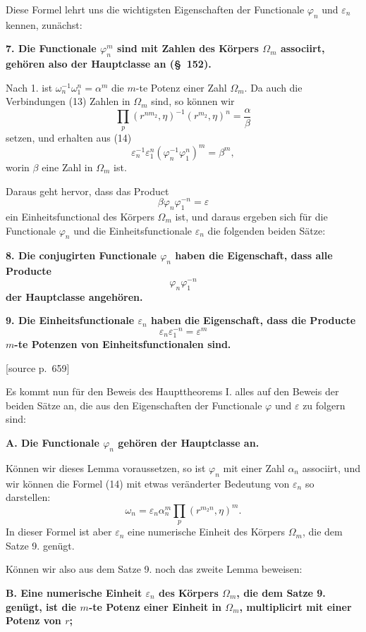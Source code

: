 \documentclass[11pt]{article}
\newcommand{\eps}{\varepsilon}
\newcommand{\srcpage}[1]{\par\medskip\noindent\textsf{[source p.~#1]}\par\smallskip}
\begin{document}
Diese Formel lehrt uns die wichtigsten Eigenschaften der Functionale $\varphi_n$ und $\eps_n$ kennen, zunächst:

\textbf{7. Die Functionale $\varphi_n^m$ sind mit Zahlen des Körpers $\Omega_m$ associirt, gehören also der Hauptclasse an (\S~152).}

Nach 1. ist $\omega_n^{-1}\omega_1^n=\alpha^m$ die $m$-te Potenz einer Zahl $\Omega_m$. Da auch die Verbindungen (13) Zahlen in $\Omega_m$ sind, so können wir
\[
  \prod_p(r^{nm_2},\eta)^{-1}(r^{m_2},\eta)^n=\frac{\alpha}{\beta}
\]
setzen, und erhalten aus (14)
\[
  \eps_n^{-1}\eps_1^n(\varphi_n^{-1}\varphi_1^n)^m=\beta^m,
\]
worin $\beta$ eine Zahl in $\Omega_m$ ist.

Daraus geht hervor, dass das Product
\[
  \beta\varphi_n\varphi_1^{-n}=\eps
\]
ein Einheitsfunctional des Körpers $\Omega_m$ ist, und daraus ergeben sich für die Functionale $\varphi_n$ und die Einheitsfunctionale $\eps_n$ die folgenden beiden Sätze:

\textbf{8. Die conjugirten Functionale $\varphi_n$ haben die Eigenschaft, dass alle Producte}
\[
  \varphi_n\varphi_1^{-n}
\]
\textbf{der Hauptclasse angehören.}

\textbf{9. Die Einheitsfunctionale $\eps_n$ haben die Eigenschaft, dass die Producte}
\[
  \eps_n\eps_1^{-n}=\eps^m
\]
\textbf{$m$-te Potenzen von Einheitsfunctionalen sind.}


\srcpage{659}
Es kommt nun für den Beweis des Haupttheorems I. alles auf den Beweis der beiden Sätze an, die aus den Eigenschaften der Functionale $\varphi$ und $\eps$ zu folgern sind:

\textbf{A. Die Functionale $\varphi_n$ gehören der Hauptclasse an.}

Können wir dieses Lemma voraussetzen, so ist $\varphi_n$ mit einer Zahl $\alpha_n$ associirt, und wir können die Formel (14) mit etwas veränderter Bedeutung von $\eps_n$ so darstellen:
\begin{equation}
  \omega_n=\eps_n\alpha_n^m\prod_p(r^{m_2 n},\eta)^m.
\tag{15}
\end{equation}
In dieser Formel ist aber $\eps_n$ eine numerische Einheit des Körpers $\Omega_m$, die dem Satze 9. genügt.

Können wir also aus dem Satze 9. noch das zweite Lemma beweisen:

\textbf{B. Eine numerische Einheit $\eps_n$ des Körpers $\Omega_m$, die dem Satze 9. genügt, ist die $m$-te Potenz einer Einheit in $\Omega_m$, multiplicirt mit einer Potenz von $r$;}
\end{document}
